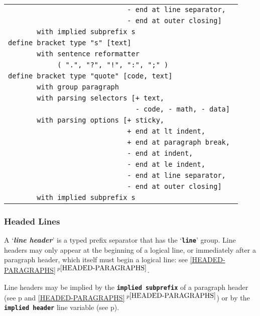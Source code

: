 \documentclass[12pt]{article}
\newcommand{\TT}[1]{{\tt \bfseries #1}}
\newcommand{\key}[1]{{\bf \em #1}\index{#1}}
\newcommand{\itemref}[1]{\ref{#1}$\,^{p\pageref{#1}}$}
\newcommand{\pagref}[1]{p\pageref{#1}}
\begin{document}
\begin{center}
\begin{tabular}{l}
\tt ~~~~~~~~~~~~~~~~~~~~~~~~~~~~~- end at line separator, \\
\tt ~~~~~~~~~~~~~~~~~~~~~~~~~~~~~- end at outer closing] \\
\tt ~~~~~~~with implied subprefix {s} \\
\tt define bracket type "s" [text] \\
\tt ~~~~~~~with sentence reformatter \\
\tt ~~~~~~~~~~~~( ".", "?", "!", ":", ";" ) \\
\tt define bracket type "quote" [code, text] \\
\tt ~~~~~~~with group paragraph \\
\tt ~~~~~~~with parsing selectors [+ text, \\
\tt ~~~~~~~~~~~~~~~~~~~~~~~~~~~~~~~- code, - math, - data] \\
\tt ~~~~~~~with parsing options [+ sticky, \\
\tt ~~~~~~~~~~~~~~~~~~~~~~~~~~~~~+ end at lt indent, \\
\tt ~~~~~~~~~~~~~~~~~~~~~~~~~~~~~+ end at paragraph break, \\
\tt ~~~~~~~~~~~~~~~~~~~~~~~~~~~~~- end at indent, \\
\tt ~~~~~~~~~~~~~~~~~~~~~~~~~~~~~- end at le indent, \\
\tt ~~~~~~~~~~~~~~~~~~~~~~~~~~~~~- end at line separator, \\
\tt ~~~~~~~~~~~~~~~~~~~~~~~~~~~~~- end at outer closing] \\
\tt ~~~~~~~with implied subprefix {s} \\
\end{tabular}

\end{center}


\subsubsection{Headed Lines}
\label{HEADED-LINES}

A `\key{line header}' is a typed prefix separator that has
the `\TT{line}' group.  Line headers may only
appear at the beginning of a logical line, or immediately
after a paragraph header, which itself must begin a logical
line: see \itemref{HEADED-PARAGRAPHS}.

Line headers may be implied by the \TT{implied subprefix}
of a paragraph header (see \pagref{IMPLIED-SUBPREFIX}
and \itemref{HEADED-PARAGRAPHS})
or by the \TT{implied header} line variable (see \pagref{IMPLIED-HEADER}).
\end{document}
